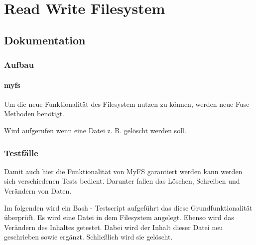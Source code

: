\part{Read Write Filesystem }
\chapter{Dokumentation}
\section{Aufbau}
\subsection{myfs}
Um die neue Funktionalität des Filesystem nutzen zu können, werden neue Fuse Methoden benötigt. 

\begin{description}[align=right,labelwidth=1.5cm]
	\item[\textbf{fuseWrite()}] Wird aufgerufen wenn eine Datei z. B. gelöscht werden soll.
\end{description} 
\newpage

\section{Testfälle}
Damit auch hier die Funktionalität von MyFS garantiert werden kann werden sich verschiedenen Tests bedient. Darunter fallen das Löschen, Schreiben und Verändern von Daten.

Im folgenden wird ein Bash - Testscript aufgeführt das diese Grundfunktionalität überprüft. Es wird eine Datei in dem Filesystem angelegt. Ebenso wird das Verändern des Inhaltes getestet. Dabei wird der Inhalt dieser Datei neu geschrieben sowie ergänzt. Schließlich wird sie gelöscht. 


